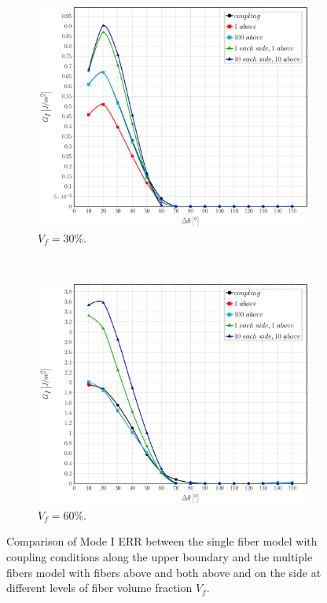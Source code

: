 \documentclass[review]{elsarticle}
\begin{document}
\begin{figure}[!h]
\centering
    \begin{subfigure}[b]{0.475\textwidth}
        \includegraphics[width=\textwidth]{comparecouplingabovesidefibers-vf30-GI.pdf}
        \caption{$V_{f}=30\%$.}\label{subfig:comparisoncoupling30MI}
    \end{subfigure} ~
    \begin{subfigure}[b]{0.475\textwidth}
        \includegraphics[width=\textwidth]{comparecouplingabovesidefibers-vf60-GI.pdf}
        \caption{$V_{f}=60\%$.}\label{subfig:comparisoncoupling60MI}
    \end{subfigure}

\caption{Comparison of Mode I ERR between the single fiber model with coupling conditions along the upper boundary and the multiple fibers model with fibers above and both above and on the side at different levels of fiber volume fraction $V_{f}$.}\label{fig:comparisoncouplingMI}
\end{figure}
\end{document}
